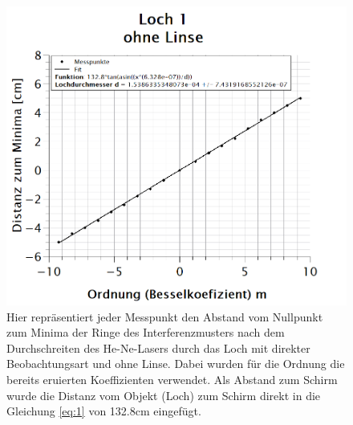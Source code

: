 \begin{figure}[h]
\centering
\includegraphics[width=\textwidth]{Bilder/loch1_ohneLinse.png} 
\caption[Loch 1: ohne Linse]{Hier repräsentiert jeder Messpunkt den Abstand vom Nullpunkt zum Minima der Ringe des Interferenzmusters nach dem Durchschreiten des He-Ne-Lasers durch das Loch mit direkter Beobachtungsart und ohne Linse. Dabei wurden für die Ordnung die bereits eruierten Koeffizienten verwendet. Als Abstand zum Schirm wurde die Distanz vom Objekt (Loch) zum Schirm direkt in die Gleichung \ref{eq:1} von 132.8cm eingefügt.}
\label{fig:loch1_ohneLinse}
\end{figure}
\newpage
